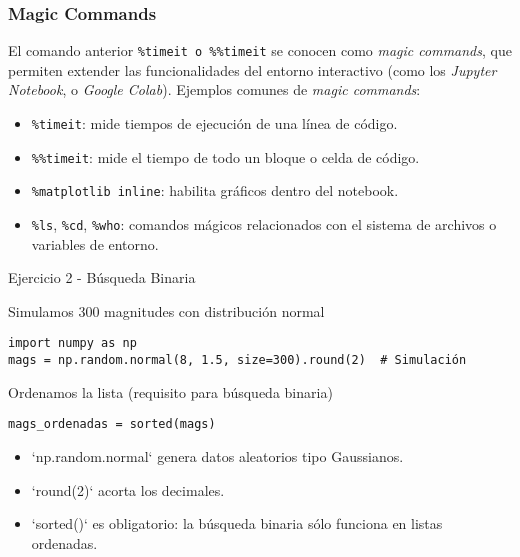 \documentclass[10pt]{beamer}
\begin{document}
\begin{frame}[fragile]
\frametitle{Magic Commands}
El comando anterior \texttt{\%timeit o \%\%timeit} se conocen como \textit{magic commands}, que permiten extender las funcionalidades del entorno interactivo (como los \textit{Jupyter Notebook}, o \textit{Google Colab}). Ejemplos comunes de \textit{magic commands}:

\begin{itemize}
  \item \texttt{\%timeit}: mide tiempos de ejecución de una línea de código.
  \item \texttt{\%\%timeit}: mide el tiempo de todo un bloque o celda de código.
  \item \texttt{\%matplotlib inline}: habilita gráficos dentro del notebook.
  \item \texttt{\%ls}, \texttt{\%cd}, \texttt{\%who}: comandos mágicos relacionados con el sistema de archivos o variables de entorno. 
\end{itemize}
\end{frame}

\begin{frame}[fragile]{Ejercicio 2 - Búsqueda Binaria}
  \begin{block}{Simulamos 300 magnitudes con distribución normal}
  \begin{verbatim}
import numpy as np
mags = np.random.normal(8, 1.5, size=300).round(2)  # Simulación
  \end{verbatim}
  \end{block}

  \begin{block}{Ordenamos la lista (requisito para búsqueda binaria)}
  \begin{verbatim}
mags_ordenadas = sorted(mags)
  \end{verbatim}
  \end{block}

  \begin{itemize}
    \item `np.random.normal` genera datos aleatorios tipo Gaussianos.
    \item `round(2)` acorta los decimales.
    \item `sorted()` es obligatorio: la búsqueda binaria sólo funciona en listas ordenadas.
  \end{itemize}
\end{frame}
\end{document}
